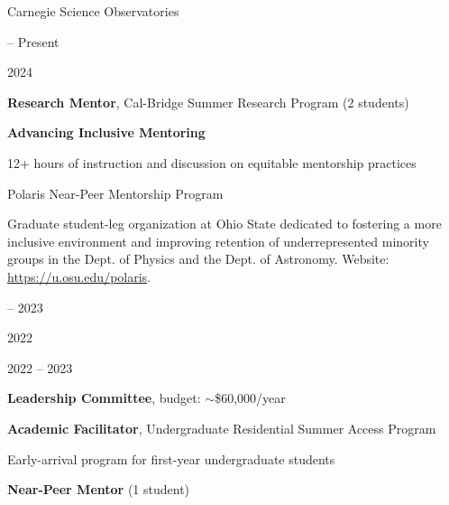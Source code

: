 \documentclass[cv.tex]{subfiles}
\begin{document}
{\color{themecolor} \large Carnegie Science Observatories}
\par\noindent
\parbox{0.18\textwidth}{%
	 -- Present \par
	2024 \par
	\null \par
}
\hspace{1mm}
\parbox{0.8\textwidth}{%
	\textbf{Research Mentor}, Cal-Bridge Summer Research Program (2 students)
	\par
	\textbf{Advancing Inclusive Mentoring} \par
	12+ hours of instruction and discussion on equitable mentorship practices
	\par
}

\vspace{5mm}
\noindent
{\color{themecolor} \large Polaris Near-Peer Mentorship Program}
\par\noindent
Graduate student-leg organization at Ohio State dedicated to fostering a more
inclusive environment and improving retention of underrepresented minority
groups in the Dept. of Physics and the Dept. of Astronomy.
Website: \url{https://u.osu.edu/polaris}.
\par\noindent
\parbox{0.18\textwidth}{%
	 -- 2023 \par
	2022 \par
	\null \par
	2022 -- 2023 \par
}
\hspace{1mm}
\parbox{0.8\textwidth}{%
	\textbf{Leadership Committee}, budget: $\sim$\$60,000/year \par
	\textbf{Academic Facilitator}, Undergraduate Residential Summer Access
	Program \par
	Early-arrival program for first-year undergraduate students \par
	\textbf{Near-Peer Mentor} (1 student) \par
}
\end{document}
